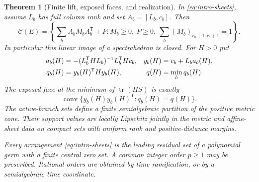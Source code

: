 \documentclass[11pt,reqno]{amsart}
\numberwithin{equation}{section}
\newtheorem{theorem}{Theorem}[section]
\theoremstyle{definition}
\theoremstyle{remark}
\newcommand{\tr}{\operatorname{tr}}
\newcommand{\cC}{\mathcal C}
\begin{document}
\begin{theorem}[Finite lift, exposed faces, and realization]\label{thm:affine}
In \eqref{eq:intro-sheets}, assume $L_b$ has full column rank and set $A_b=[L_b,c_b]$. Then
\begin{equation}\label{eq:lift}
 \cC(E)=\left\{\sum_b A_bM_bA_b^{\mathsf T}+P:
 M_b\ge0,\ P\ge0,\ \sum_b(M_b)_{r_b+1,r_b+1}=1\right\}.
\end{equation}
In particular this linear image of a spectrahedron is closed. For $H>0$ put
\begin{align}
 a_b(H)&=-(L_b^{\mathsf T}HL_b)^{-1}L_b^{\mathsf T}Hc_b,
 &y_b(H)&=c_b+L_ba_b(H),\notag\\
 q_b(H)&=y_b(H)^{\mathsf T}Hy_b(H),
 &q(H)&=\min_bq_b(H).\label{eq:branch-support}
\end{align}
The exposed face at the minimum of $\tr(HS)$ is exactly
\begin{equation}\label{eq:face}
 \operatorname{conv}\{y_b(H)y_b(H)^{\mathsf T}:q_b(H)=q(H)\}.
\end{equation}
The active-branch sets define a finite semialgebraic partition of the positive metric cone. Their support values are locally Lipschitz jointly in the metric and affine-sheet data on compact sets with uniform rank and positive-distance margins.

Every arrangement \eqref{eq:intro-sheets} is the leading residual set of a polynomial germ with a finite central zero set. A common integer order $p\ge1$ may be prescribed. Rational orders are obtained by time ramification, or by a semialgebraic time coordinate.
\end{theorem}
\end{document}
